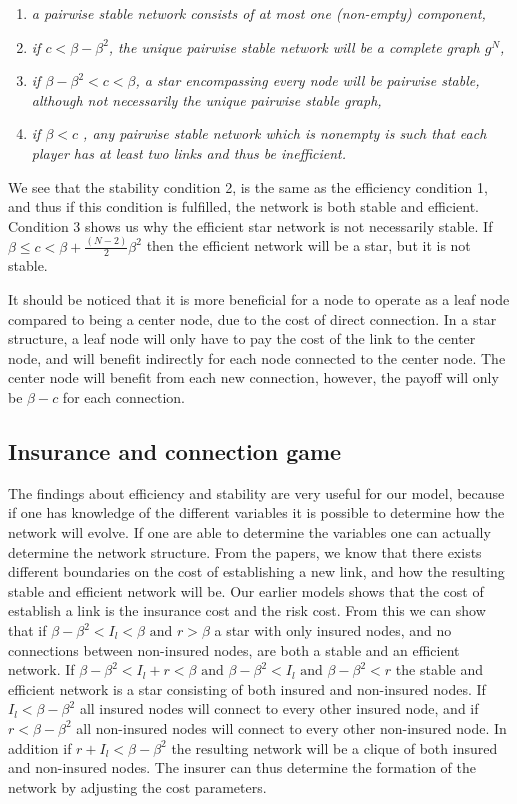 \begin{enumerate}
\item \textit{a pairwise stable network consists of at most one (non-empty) component,}
\item \textit{if $c<\beta - \beta^2$, the unique pairwise stable network will be a complete graph $g^N$, }
\item \textit{if $\beta - \beta^2 <c < \beta $, a star encompassing every node will be pairwise stable, although not necessarily the unique pairwise stable graph,}
\item \textit{if $\beta < c$ , any pairwise stable network which is nonempty is such that each player has at least two links and thus be inefficient. }
\end{enumerate}
We see that the stability condition 2, is the same as the efficiency condition 1, and thus if this condition is fulfilled, the network is both stable and efficient. 
Condition 3 shows us why the efficient star network is not necessarily  stable. If $\beta \leq c <   \beta + \frac{(N-2)}{2}\beta^2$ then the efficient network will be a star, but it is not stable.

It should be noticed that it is more beneficial for a node to operate as a leaf node compared to being a center node, due to the cost of direct connection. In a star structure, a leaf node will only have to pay the cost of the link to the center node, and will benefit indirectly for each node connected to the center node. The center node will benefit from each new connection, however, the payoff will only be $\beta - c$ for each connection. 

\subsection{Insurance and connection game}
The findings about efficiency and stability are very useful for our model, because if one has knowledge of the different variables it is possible to determine how the network will evolve. If one are able to determine the variables one can actually determine the network structure.
From the papers, we know that there exists different boundaries on the cost of establishing a new link, and how the resulting stable and efficient network will be.
Our earlier models shows that the cost of establish a link is the insurance cost and the risk cost. From this we can show that if $\beta - \beta^2 <I_{l}<\beta \text{ and } r>\beta$ a star with only insured nodes, and no connections between non-insured nodes, are both a stable and an efficient network. If $\beta - \beta^2 <I_{l}+r<\beta \text{ and } \beta - \beta^2<I_{l} \text{ and } \beta - \beta^2<r $ the stable and efficient network is a star consisting of both insured and non-insured nodes. If $I_{l}<\beta-\beta^2$ all insured nodes will connect to every other insured node, and if $r<\beta-\beta^2$ all non-insured nodes will connect to every other non-insured node.
In addition if $r+I_{l}<\beta-\beta^2$ the resulting network will be a clique of both insured and non-insured nodes.
The insurer can thus determine the formation of the network by adjusting the cost parameters. 

